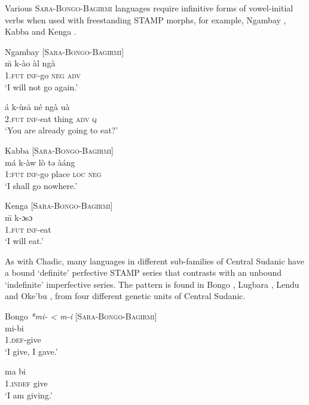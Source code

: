 \documentclass[output=paper]{langsci/langscibook}
\begin{document}
Various \textsc{Sara-Bongo-Bagirmi} languages require infinitive forms of vowel-initial verbs when used with freestanding STAMP morphs, for example, Ngambay , Kabba  and Kenga .

\ea\label{ex:anderson:48}
Ngambay \citep[118]{Vandame1963}      [\textsc{Sara-Bongo-Bagirmi}]\\
\ea\label{ex:anderson:48a}
\={m}    k-ào   àl   ngà\\
   1.\textsc{fut}   \textsc{inf}-go  \textsc{neg}   \textsc{adv}\\
\glt `I will not go again.'

\ex \label{ex:anderson:48b}
\gll á   k-ùs\={a}    né   ngà   uà\\
 2.\textsc{fut}   \textsc{inf}-eat thing   \textsc{adv}   \textsc{q}\\
\glt `You are already going to eat?'
\z
\z

\ea\label{ex:anderson:49}
Kabba  \citep[220]{Moser2004}         [\textsc{Sara-Bongo-Bagirmi}]\\
\gll má  k-àw  lò  tə  àáng    \\
1:\textsc{fut}  \textsc{inf}-go  place  \textsc{loc}  \textsc{neg}    \\
\glt `I shall go nowhere.'
\z

\ea\label{ex:anderson:50}
Kenga  \citep[15]{Neukom2010}        [\textsc{Sara-Bongo-Bagirmi}]\\
\gll \={m}    k-ɔsɔ\\
1.\textsc{fut}  \textsc{inf}-eat\\
\glt `I will eat.'
\z

As with Chadic, many languages in different sub-families of Central Sudanic have a bound `definite' perfective STAMP series that contrasts with an unbound `indefinite' imperfective series. The pattern is found in Bongo , Lugbara , Lendu  and Oke'bu , from four different genetic units of Central Sudanic. 

\ea\label{ex:anderson:51}
Bongo   \textit{*mi- < m-i} \citep[75]{TuckerBryan1966}    [\textsc{Sara-Bongo-Bagirmi}]\\
\ea\label{ex:anderson:51a}
\gll mi-bi\\
1.\textsc{def}-give\\
\glt `I give, I gave.'

\ex \label{ex:anderson:51b}
\gll ma    bi\\
 1.\textsc{indef}  give\\
\glt  `I am giving.'    
\z
\z
\end{document}
